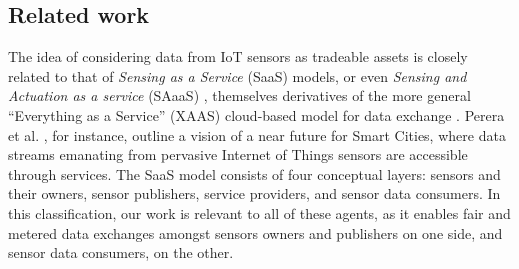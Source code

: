 \documentclass[chi_draft]{sigchi}
\begin{document}
{\subsection{Related work}




The idea of considering data from IoT sensors as tradeable assets is closely related to that of \textit{Sensing as a Service} (SaaS) models, or even \textit{Sensing and Actuation as a service} (SAaaS) \cite{distefano2012sensing}, themselves derivatives of the more general ``Everything as a Service'' (XAAS) cloud-based model for data exchange \cite{5719575}. Perera et al. \cite{Perera2014}, for instance, outline a vision of a near future for Smart Cities, where data streams emanating from pervasive Internet of Things sensors are accessible through services. The SaaS model consists of four conceptual layers: sensors and their owners, sensor publishers, service providers, and sensor data consumers. In this classification, our work is relevant to all of these agents, as it enables fair and metered data exchanges amongst sensors owners and publishers on one side, and sensor data consumers, on the other.
%
%

}
\end{document}
